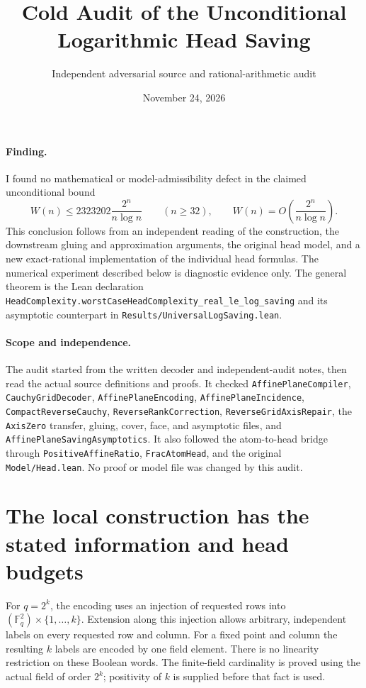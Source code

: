 \documentclass[11pt]{article}
\title{Cold Audit of the Unconditional Logarithmic Head Saving}
\author{Independent adversarial source and rational-arithmetic audit}
\date{November 24, 2026}
\begin{document}
\maketitle

\paragraph{Finding.}
I found no mathematical or model-admissibility defect in the claimed
unconditional bound
\[
 W(n)\leq2323202\frac{2^n}{n\log n}\qquad(n\geq32),
 \qquad W(n)=O\!\left(\frac{2^n}{n\log n}\right).
\]
This conclusion follows from an independent reading of the construction,
the downstream gluing and approximation arguments, the original head model,
and a new exact-rational implementation of the individual head formulas.
The numerical experiment described below is diagnostic evidence only.
The general theorem is the Lean declaration
\texttt{HeadComplexity.worstCaseHeadComplexity\_real\_le\_log\_saving}
and its asymptotic counterpart in
\texttt{Results/UniversalLogSaving.lean}.

\paragraph{Scope and independence.}
The audit started from the written decoder and independent-audit notes,
then read the actual source definitions and proofs. It checked
\texttt{AffinePlaneCompiler}, \texttt{CauchyGridDecoder},
\texttt{AffinePlaneEncoding}, \texttt{AffinePlaneIncidence},
\texttt{CompactReverseCauchy}, \texttt{ReverseRankCorrection},
\texttt{ReverseGridAxisRepair}, the \texttt{AxisZero} transfer, gluing,
cover, face, and asymptotic files, and
\texttt{AffinePlaneSavingAsymptotics}. It also followed the atom-to-head
bridge through \texttt{PositiveAffineRatio}, \texttt{FracAtomHead},
and the original \texttt{Model/Head.lean}. No proof or model file was
changed by this audit.

\section{The local construction has the stated information and head budgets}
For $q=2^k$, the encoding uses an injection of requested rows into
$(\mathbb F_q^2)\times\{1,\ldots,k\}$. Extension along this injection
allows arbitrary, independent labels on every requested row and column.
For a fixed point and column the resulting $k$ labels are encoded by one
field element. There is no linearity restriction on these Boolean words.
The finite-field cardinality is proved using the actual field of order
$2^k$; positivity of $k$ is supplied before that fact is used.
\end{document}
